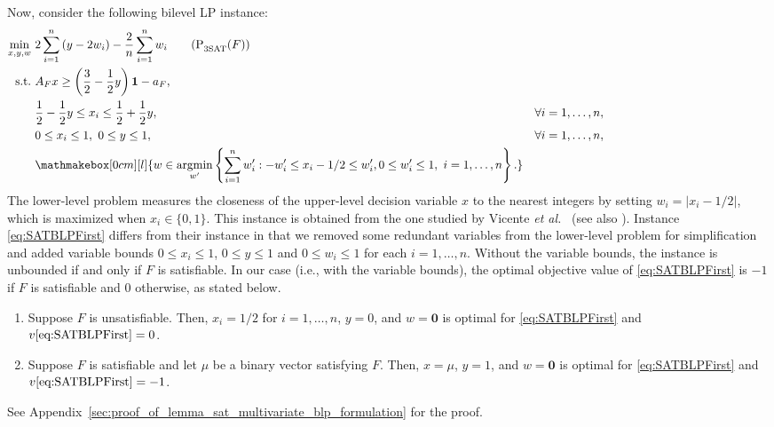 \documentclass[runningheads,orivec]{llncs}
\newif\ifIPCOFlag
\newcommand{\IPCO}[2]{\ifIPCOFlag#1\else#2\fi}
\newcommand{\EtAl}{\textit{et al.}}
\newcommand{\MacroColor}[1]{#1}
\DeclareMathOperator*{\Argmin}{\MacroColor{argmin}}
\newcommand{\ZeroVector}{\mathbf{0}}
\newcommand{\OneVector}{\mathbf{1}}
\newcommand{\NVariables}{\MacroColor{n}}
\newcommand{\OptValFunc}{\MacroColor{v}}
\newcommand{\SATBooleanFormula}{\MacroColor{F}}
\newcommand{\ReformFrac}{\MacroColor{w}}
\newcommand{\BinaryVector}{\MacroColor{\mu}}
\begin{document}
Now, consider the following bilevel LP instance:
\begin{alignat}{2}
\min_{x, y, \ReformFrac} \ & 2 \sum_{i = 1}^{n} \left(y - 2 \ReformFrac_i \right) - \frac{2}{n} \sum_{i = 1}^n \ReformFrac_i
\tag{P${}_{\text{3SAT}}^{\text{}}(\SATBooleanFormula)$}
\label{eq:SATBLPFirst}
\\
\text{s.t.} \ &
A_{\SATBooleanFormula} x \ge \left(\frac{3}{2} - \frac{1}{2} y\right) \OneVector - a_{\SATBooleanFormula}, \label{eq:SATBLPFirstConstraintOne} \\
&
\frac{1}{2} - \frac{1}{2} y \le x_{i} \le \frac{1}{2} + \frac{1}{2} y, 
&&
\forall i = 1, \ldots, \NVariables,
\label{eq:SATBLPFirstConstraintTwo} \\
& 0 \le x_i \le 1, \ 0 \le y \le 1, 
&&
\forall i = 1, \ldots, \NVariables, 
\hspace{13em}
\notag \\
&
\mathmakebox[0cm][l]{
\ReformFrac \in \Argmin_{\ReformFrac'} 
\left\{ 
\sum_{i = 1}^n \ReformFrac_i'
:
-\ReformFrac_i' \le x_i - 1/2 \le \ReformFrac_i', 0 \le \ReformFrac_i' \le 1, \ i = 1, \ldots, n
\right\}. 
}
\notag 
\end{alignat}
\label{Rev:MeaningOfLowerLevel} The lower-level problem measures the closeness of the upper-level decision variable $x$ to the nearest integers by setting $\ReformFrac_i = |x_i - 1/2|$, which is maximized when $x_i \in \{0, 1\}$.
This instance is obtained from the one studied by Vicente \EtAl{}~\cite{vicente1994descent} (see also \cite{RodriguesEtAl2024}).
Instance \eqref{eq:SATBLPFirst} differs from their instance in that we removed some redundant variables from the lower-level problem for simplification and added variable bounds $0 \le x_i \le 1$, $0 \le y \le 1$ and $0 \le w_i \le 1$ for each $i = 1, \ldots, \NVariables$.
Without the variable bounds, the instance is unbounded if and only if $\SATBooleanFormula$ is satisfiable.
In our case (i.e., with the variable bounds), the optimal objective value of \eqref{eq:SATBLPFirst} is $-1$ if $\SATBooleanFormula$ is satisfiable and 0 otherwise, as stated below.
\begin{lemma}
\label{lemma:SATBLPFirst}
\mbox{}
\begin{enumerate}
\item
Suppose $\SATBooleanFormula$ is unsatisfiable.
Then, $x_i = 1/2$ for $i = 1, \ldots, \NVariables$, $y = 0$, and $w = \ZeroVector$ is optimal for \eqref{eq:SATBLPFirst} and $\OptValFunc\eqref{eq:SATBLPFirst} = 0$.
\item
Suppose $\SATBooleanFormula$ is satisfiable and let $\BinaryVector$ be a binary vector satisfying $\SATBooleanFormula$.
Then, $x = \BinaryVector$, $y = 1$, and $w = \ZeroVector$  is optimal for \eqref{eq:SATBLPFirst} and $\OptValFunc\eqref{eq:SATBLPFirst} = -1$.
\end{enumerate}
\end{lemma}
See \IPCO{the full version of the paper~\cite{sugishita2025complexitybilevellinearprogramming}}{Appendix~\ref{sec:proof_of_lemma_sat_multivariate_blp_formulation}} for the proof.
\end{document}

